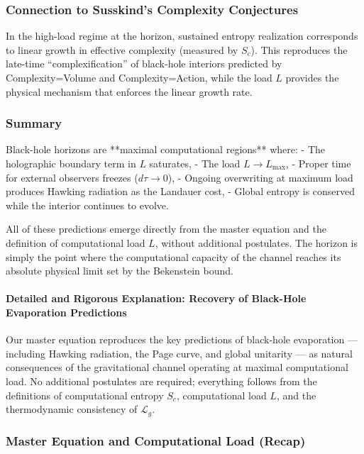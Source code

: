 \documentclass[reprint,amsmath,amssymb,aps,prd,preprintnumbers,superscriptaddress,longbibliography,10pt]{revtex4-2}
\begin{document}
\subsubsection{Connection to Susskind's Complexity Conjectures}

In the high-load regime at the horizon, sustained entropy realization corresponds to linear growth in effective complexity (measured by $S_c$). This reproduces the late-time “complexification” of black-hole interiors predicted by Complexity=Volume and Complexity=Action, while the load $L$ provides the physical mechanism that enforces the linear growth rate.

\subsubsection{Summary}

Black-hole horizons are **maximal computational regions** where:
- The holographic boundary term in $L$ saturates,
- The load $L \to L_{\max}$,
- Proper time for external observers freezes ($d\tau \to 0$),
- Ongoing overwriting at maximum load produces Hawking radiation as the Landauer cost,
- Global entropy is conserved while the interior continues to evolve.

All of these predictions emerge directly from the master equation and the definition of computational load $L$, without additional postulates. The horizon is simply the point where the computational capacity of the channel reaches its absolute physical limit set by the Bekenstein bound.

\paragraph{Detailed and Rigorous Explanation: Recovery of Black-Hole Evaporation Predictions}

Our master equation reproduces the key predictions of black-hole evaporation — including Hawking radiation, the Page curve, and global unitarity — as natural consequences of the gravitational channel operating at maximal computational load. No additional postulates are required; everything follows from the definitions of computational entropy \(S_c\), computational load \(L\), and the thermodynamic consistency of \(\mathcal{L}_g\).

\subsubsection{Master Equation and Computational Load (Recap)}
\end{document}
